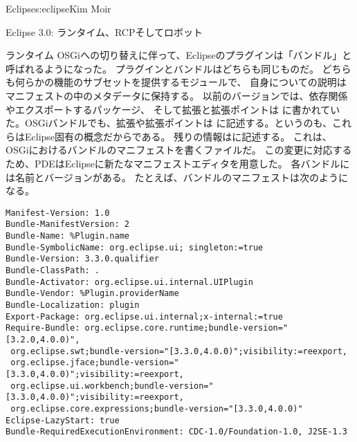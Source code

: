 \begin{aosachapter}{Eclipse}{s:eclipse}{Kim Moir}
\begin{aosasect1}{Eclipse 3.0: ランタイム、RCPそしてロボット}
\begin{aosasect2}{ランタイム}
OSGiへの切り替えに伴って、Eclipseのプラグインは「バンドル」と呼ばれるようになった。
プラグインとバンドルはどちらも同じものだ。
どちらも何らかの機能のサブセットを提供するモジュールで、
自身についての説明はマニフェストの中のメタデータに保持する。
以前のバージョンでは、依存関係やエクスポートするパッケージ、
そして拡張と拡張ポイントは
に書かれていた。OSGiバンドルでも、拡張や拡張ポイントは
に記述する。というのも、これらはEclipse固有の概念だからである。
残りの情報はに記述する。
これは、OSGiにおけるバンドルのマニフェストを書くファイルだ。
この変更に対応するため、PDEはEclipseに新たなマニフェストエディタを用意した。
各バンドルには名前とバージョンがある。
たとえば、バンドルのマニフェストは次のようになる。

\begin{verbatim}
Manifest-Version: 1.0
Bundle-ManifestVersion: 2
Bundle-Name: %Plugin.name
Bundle-SymbolicName: org.eclipse.ui; singleton:=true
Bundle-Version: 3.3.0.qualifier
Bundle-ClassPath: .
Bundle-Activator: org.eclipse.ui.internal.UIPlugin
Bundle-Vendor: %Plugin.providerName
Bundle-Localization: plugin
Export-Package: org.eclipse.ui.internal;x-internal:=true
Require-Bundle: org.eclipse.core.runtime;bundle-version="[3.2.0,4.0.0)",
 org.eclipse.swt;bundle-version="[3.3.0,4.0.0)";visibility:=reexport,
 org.eclipse.jface;bundle-version="[3.3.0,4.0.0)";visibility:=reexport,
 org.eclipse.ui.workbench;bundle-version="[3.3.0,4.0.0)";visibility:=reexport,
 org.eclipse.core.expressions;bundle-version="[3.3.0,4.0.0)"
Eclipse-LazyStart: true
Bundle-RequiredExecutionEnvironment: CDC-1.0/Foundation-1.0, J2SE-1.3
\end{verbatim}


\end{aosasect2}
\end{aosasect1}
\end{aosachapter}
